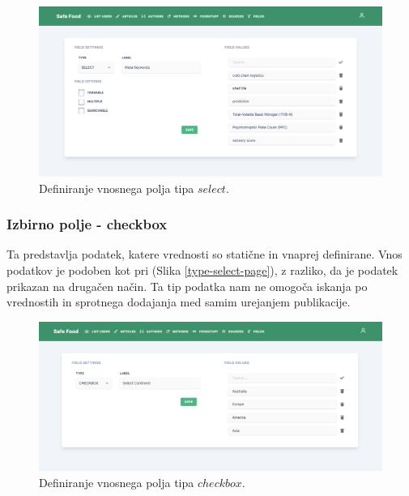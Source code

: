 \documentclass[a4paper, 12pt]{book}
\begin{document}
\begin{figure}[h]
\begin{center}
\includegraphics[width=1\textwidth]{slike/type_select.png}
\end{center}
\caption{ Definiranje vnosnega polja tipa $select$. }
\label{type-select}
\end{figure}


\subsubsection{Izbirno polje - checkbox}
\label{type-checkbox-page}
Ta predstavlja podatek, katere vrednosti so statične in vnaprej definirane. Vnos podatkov je podoben kot pri  (Slika \ref{type-select-page}), z razliko, da je podatek prikazan na drugačen način. Ta tip podatka nam ne omogoča iskanja po vrednostih in sprotnega dodajanja med samim urejanjem publikacije.

\begin{figure}[h]
\begin{center}
\includegraphics[width=1\textwidth]{slike/type_checkbox.png}
\end{center}
\caption{ Definiranje vnosnega polja tipa $checkbox$. }
\label{type-checkbox}
\end{figure}
\end{document}

